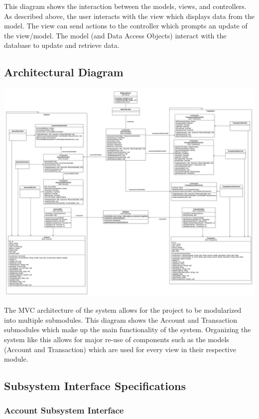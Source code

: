 \documentclass[12pt]{article}
\begin{document}
This diagram shows the interaction between the models, views, and controllers.
As described above, the user interacts with the view which displays data from the model.
The view can send actions to the controller which prompts an update of the view/model.
The model (and Data Access Objects) interact with the database to update and retrieve data.

\subsection{Architectural Diagram}
\includegraphics[scale=0.12]{classdiagram}

The MVC architecture of the system allows for the project to be modularized
into multiple submodules. This diagram shows the Account and Transaction
submodules which make up the main functionality of the system. Organizing the system
like this allows for major re-use of components such as the models (Account and Transaction)
which are used for every view in their respective module.

\subsection{Subsystem Interface Specifications}

\subsubsection{Account Subsystem Interface}
\end{document}
